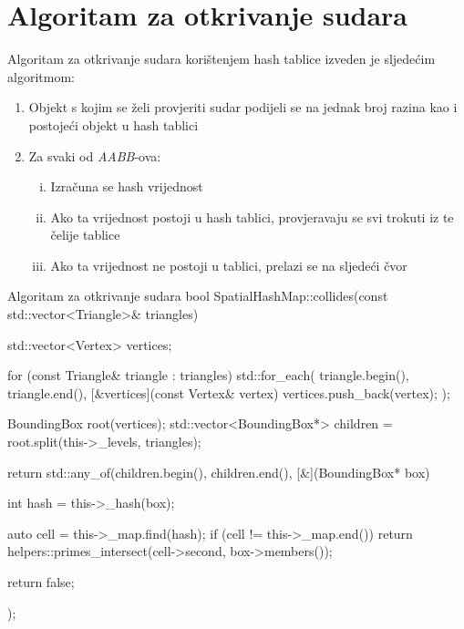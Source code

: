 \section{Algoritam za otkrivanje sudara}

Algoritam za otkrivanje sudara korištenjem hash
tablice izveden je sljedećim algoritmom:

\begin{enumerate}
    \item Objekt s kojim se želi provjeriti sudar podijeli se na jednak broj razina kao i 
          postojeći objekt u hash tablici
    \item Za svaki od \textit{AABB}-ova:
    \begin{enumerate}[i.]
        \item Izračuna se hash vrijednost
        \item Ako ta vrijednost postoji u hash tablici, provjeravaju
              se svi trokuti iz te čelije tablice
        \item Ako ta vrijednost ne postoji u tablici, prelazi se na sljedeći čvor
    \end{enumerate}
\end{enumerate}

\begin{cppSource}{Algoritam za otkrivanje sudara}
bool SpatialHashMap::collides(const std::vector<Triangle>& triangles) {
    std::vector<Vertex> vertices;

    for (const Triangle& triangle : triangles)
        std::for_each(
            triangle.begin(),
            triangle.end(),
            [&vertices](const Vertex& vertex) {
                vertices.push_back(vertex);
            }
        );

    BoundingBox root(vertices);
    std::vector<BoundingBox*> children = root.split(this->_levels, triangles);

    return std::any_of(children.begin(), children.end(), [&](BoundingBox* box) {
        int hash = this->_hash(box);

        auto cell = this->_map.find(hash);
        if (cell != this->_map.end()) {
            return helpers::primes_intersect({cell->second, box->members()});
        }

        return false;
    });
}
\end{cppSource}